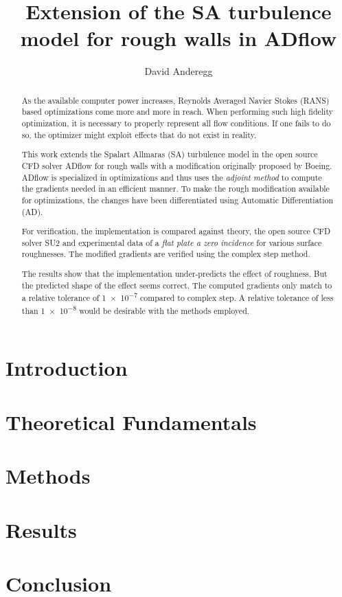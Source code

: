 \documentclass[a4paper, 10pt]{report}
\title{Extension of the SA turbulence model for rough walls in ADflow}
\author{David Anderegg}
\begin{document}
    


    \begin{abstract}
      As the available computer power increases, Reynolds Averaged Navier Stokes
(RANS) based optimizations come more and more in reach. When performing such
high fidelity optimization, it is necessary to properly represent all flow
conditions. If one fails to do so, the optimizer might exploit effects that do
not exist in reality.

      This work extends the Spalart Allmaras (SA) turbulence model in the open
source CFD solver ADflow for rough walls with a modification originally proposed
by Boeing. ADflow is specialized in optimizations and thus uses the
\textit{adjoint method} to compute the gradients needed in an efficient manner.
To make the rough modification available for optimizations, the changes have
been differentiated using Automatic Differentiation (AD).

    For verification, the implementation is compared against theory, the open
source CFD solver SU2 and experimental data of a \textit{flat plate a zero
incidence} for various surface roughnesses. The modified gradients are verified
using the complex step method.

    The results show that the implementation under-predicts the effect of
roughness. But the predicted shape of the effect seems correct. The computed
gradients only match to a relative tolerance of \num{1e-7} compared to complex
step. A relative tolerance of less than \num{1e-8} would be desirable with the
methods employed.


    \end{abstract}

    \tableofcontents\clearpage


    \chapter{Introduction}
    

    \chapter{Theoretical Fundamentals}
    

    \chapter{Methods}
    


    \chapter{Results}
    


    \chapter{Conclusion}
    

    \listoffigures\clearpage
    \listoftables\clearpage


    \printbibliography
\end{document}
